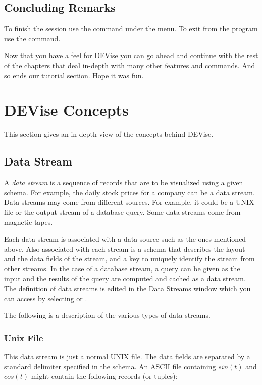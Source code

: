 \subsection{Concluding Remarks}

To finish the session use the  command under the
 menu. To exit from the program use the 
command.
	
Now that you have a feel for DEVise you can go ahead and continue
with the rest of the chapters that deal in-depth with many other
features and commands. And so ends our tutorial section. Hope it was
fun.

\section{DEVise Concepts}

This section gives an in-depth view of the concepts behind DEVise.

\subsection{Data Stream}

A {\em data stream} is a sequence of records that are to be visualized
using a given schema. For example, the daily stock prices for a
company can be a data stream. Data streams may come from different
sources. For example, it could be a UNIX file or the output stream of
a database query. Some data streams come from magnetic tapes.

Each data stream is associated with a data source such as the ones
mentioned above. Also associated with each stream is a schema that
describes the layout and the data fields of the stream, and a key to
uniquely identify the stream from other streams. In the case of a
database stream, a query can be given as the input and the results of
the query are computed and cached as a data stream. The definition of
data streams is edited in the Data Streams window which you can access
by selecting  or .

The following is a description of the various types of data streams.

\subsubsection{Unix File}

This data stream is just a normal UNIX file. The data fields are
separated by a standard delimiter specified in the schema. An ASCII
file containing $sin(t)$ and $cos(t)$ might contain the following
records (or tuples):

